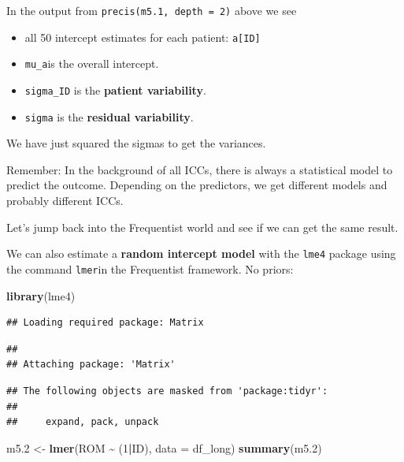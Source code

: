 \documentclass[
]{book}
\newenvironment{Shaded}{\begin{snugshade}}{\end{snugshade}}
\newcommand{\AttributeTok}[1]{\textcolor[rgb]{0.13,0.29,0.53}{#1}}
\newcommand{\DecValTok}[1]{\textcolor[rgb]{0.00,0.00,0.81}{#1}}
\newcommand{\FloatTok}[1]{\textcolor[rgb]{0.00,0.00,0.81}{#1}}
\newcommand{\FunctionTok}[1]{\textcolor[rgb]{0.13,0.29,0.53}{\textbf{#1}}}
\newcommand{\NormalTok}[1]{#1}
\newcommand{\OtherTok}[1]{\textcolor[rgb]{0.56,0.35,0.01}{#1}}
\newcommand{\SpecialCharTok}[1]{\textcolor[rgb]{0.81,0.36,0.00}{\textbf{#1}}}
\providecommand{\tightlist}{%
  \setlength{\itemsep}{0pt}\setlength{\parskip}{0pt}}
\begin{document}
In the output from \texttt{precis(m5.1,\ depth\ =\ 2)} above we see

\begin{itemize}
\tightlist
\item
  all 50 intercept estimates for each patient: \texttt{a{[}ID{]}}
\item
  \texttt{mu\_a}is the overall intercept.
\item
  \texttt{sigma\_ID} is the \textbf{patient variability}.
\item
  \texttt{sigma} is the \textbf{residual variability}.
\end{itemize}

We have just squared the sigmas to get the variances.

Remember: In the background of all ICCs, there is always a statistical model to predict
the outcome. Depending on the predictors, we get different models and
probably different ICCs.

Let's jump back into the Frequentist world and see if we can get the same result.

We can also estimate a \textbf{random intercept model} with the \texttt{lme4} package using
the command \texttt{lmer}in the Frequentist framework. No priors:

\begin{Shaded}
\begin{Highlighting}[]
\FunctionTok{library}\NormalTok{(lme4)}
\end{Highlighting}
\end{Shaded}

\begin{verbatim}
## Loading required package: Matrix
\end{verbatim}

\begin{verbatim}
## 
## Attaching package: 'Matrix'
\end{verbatim}

\begin{verbatim}
## The following objects are masked from 'package:tidyr':
## 
##     expand, pack, unpack
\end{verbatim}

\begin{Shaded}
\begin{Highlighting}[]
\NormalTok{m5}\FloatTok{.2} \OtherTok{\textless{}{-}} \FunctionTok{lmer}\NormalTok{(ROM }\SpecialCharTok{\textasciitilde{}}\NormalTok{ (}\DecValTok{1}\SpecialCharTok{|}\NormalTok{ID), }\AttributeTok{data =}\NormalTok{ df\_long)}
\FunctionTok{summary}\NormalTok{(m5}\FloatTok{.2}\NormalTok{)}
\end{Highlighting}
\end{Shaded}
\end{document}

